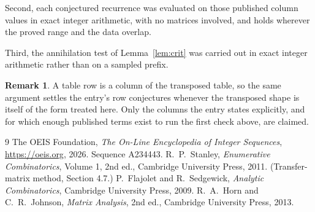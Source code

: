 \documentclass[11pt,a4paper]{article}
\theoremstyle{plain}
\theoremstyle{definition}
\newtheorem{remark}[theorem]{Remark}
\begin{document}
Second, each conjectured recurrence was evaluated on those published column values in exact
integer arithmetic, with no matrices involved, and holds wherever the proved range and the
data overlap.

Third, the annihilation test of Lemma~\ref{lem:crit} was carried out in exact integer
arithmetic rather than on a sampled prefix.

\begin{remark}
A table row is a column of the transposed table, so the same argument settles the entry's row
conjectures whenever the transposed shape is itself of the form treated here. Only the columns
the entry states explicitly, and for which enough published terms exist to run the first check
above, are claimed.
\end{remark}

\begin{thebibliography}{9}
 The OEIS Foundation, \emph{The On-Line Encyclopedia of Integer
Sequences}, \url{https://oeis.org}, 2026. Sequence A234443.
 R.~P.~Stanley, \emph{Enumerative Combinatorics}, Volume 1, 2nd ed.,
Cambridge University Press, 2011. (Transfer-matrix method, Section 4.7.)
 P.~Flajolet and R.~Sedgewick, \emph{Analytic Combinatorics}, Cambridge
University Press, 2009.
 R.~A.~Horn and C.~R.~Johnson, \emph{Matrix Analysis}, 2nd ed., Cambridge
University Press, 2013.
\end{thebibliography}
\end{document}

